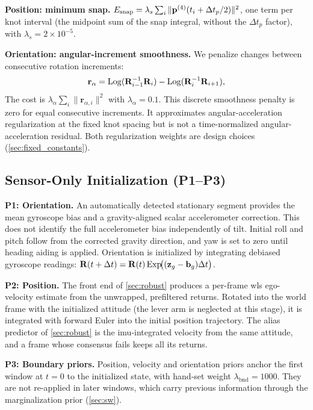 \textbf{Position: minimum snap.}
$E_{\text{snap}} = \lambda_s \sum_i \|\mathbf{p}^{(4)}(t_i + \Delta t_p/2)\|^2$,
one term per knot interval (the midpoint sum of the snap integral,
without the $\Delta t_p$ factor), with $\lambda_s = 2{\times}10^{-5}$.

\textbf{Orientation: angular-increment smoothness.}
We penalize changes between consecutive rotation increments:
\begin{equation}
  \mathbf{r}_\alpha = \mathrm{Log}(\mathbf{R}_{i-1}^{-1}\mathbf{R}_i)
                    - \mathrm{Log}(\mathbf{R}_i^{-1}\mathbf{R}_{i+1}),
  \label{eq:min_alpha}
\end{equation}
The cost is $\lambda_\alpha\sum_i\lVert\mathbf{r}_{\alpha,i}\rVert^2$
with $\lambda_\alpha=0.1$.  This discrete smoothness penalty is zero
for equal consecutive increments.  It approximates angular-acceleration
regularization at the fixed knot spacing but is not a time-normalized
angular-acceleration residual.  Both regularization weights are design
choices (\autoref{sec:fixed_constants}).

\subsection{Sensor-Only Initialization (P1--P3)}
\label{sec:init}

\textbf{P1: Orientation.}
An automatically detected stationary segment provides the mean
gyroscope bias and a gravity-aligned scalar accelerometer correction.
This does not identify the full accelerometer bias independently of
tilt.  Initial roll and pitch follow from the corrected gravity
direction, and yaw is set to zero until heading aiding is applied.
Orientation is initialized by integrating debiased gyroscope readings:
$\mathbf{R}(t+\Delta t) = \mathbf{R}(t)\,\mathrm{Exp}\!\bigl((\mathbf{z}_g - \mathbf{b}_g)\Delta t\bigr)$.

\textbf{P2: Position.}
The front end of \autoref{sec:robust} produces a per-frame \ac{wls}
ego-velocity estimate from the unwrapped, prefiltered returns.
Rotated into the world frame with the initialized attitude (the lever
arm is neglected at this stage), it is integrated with forward Euler
into the initial position trajectory.  The alias predictor of
\autoref{sec:robust} is the \ac{imu}-integrated velocity from the same
attitude, and a frame whose consensus fails keeps all its returns.

\textbf{P3: Boundary priors.}
Position, velocity and orientation priors anchor the first window at
$t=0$ to the initialized state, with hand-set weight
$\lambda_{\text{bnd}}=1000$.  They are not re-applied in later windows,
which carry previous information through the marginalization prior
(\autoref{sec:sw}).

